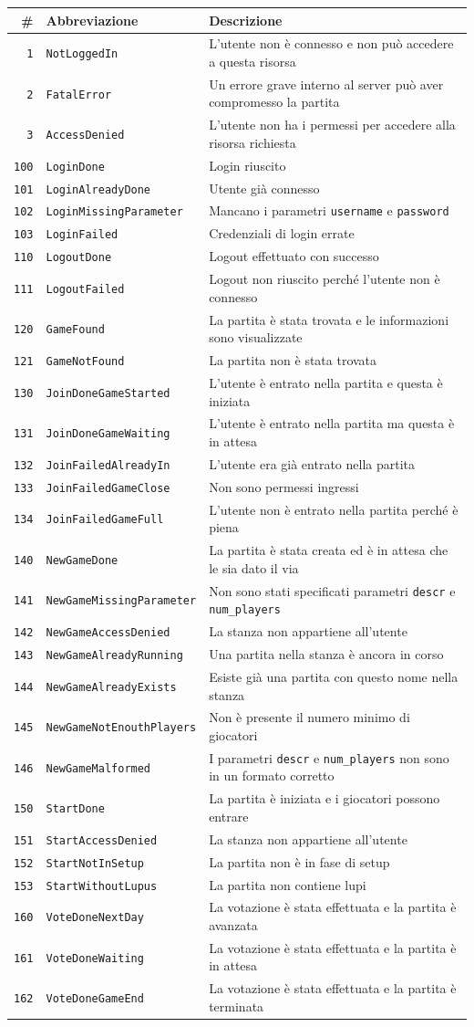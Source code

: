 \documentclass[10pt,a4paper]{article}
\newcommand{\apicode}[3]{
\texttt{#1} & \texttt{#2} & #3 \\
}
\begin{document}
\resizebox{\textwidth}{!} {
\begin{tabular}{|rl|l|}
\hline
\textbf{\#} & \textbf{Abbreviazione} & \textbf{Descrizione} \\
\hline
\apicode{1}{NotLoggedIn}{L'utente non è connesso e non può accedere a questa risorsa}
\apicode{2}{FatalError}{Un errore grave interno al server può aver compromesso la partita}
\apicode{3}{AccessDenied}{L'utente non ha i permessi per accedere alla risorsa richiesta}
\hline
\apicode{100}{LoginDone}{Login riuscito}
\apicode{101}{LoginAlreadyDone}{Utente già connesso}
\apicode{102}{LoginMissingParameter}{Mancano i parametri \texttt{username} e \texttt{password}}
\apicode{103}{LoginFailed}{Credenziali di login errate}
\hline
\apicode{110}{LogoutDone}{Logout effettuato con successo}
\apicode{111}{LogoutFailed}{Logout non riuscito perché l'utente non è connesso}
\hline
\apicode{120}{GameFound}{La partita è stata trovata e le informazioni sono visualizzate}
\apicode{121}{GameNotFound}{La partita non è stata trovata}
\hline
\apicode{130}{JoinDoneGameStarted}{L'utente è entrato nella partita e questa è iniziata}
\apicode{131}{JoinDoneGameWaiting}{L'utente è entrato nella partita ma questa è in attesa}
\apicode{132}{JoinFailedAlreadyIn}{L'utente era già entrato nella partita}
\apicode{133}{JoinFailedGameClose}{Non sono permessi ingressi}
\apicode{134}{JoinFailedGameFull}{L'utente non è entrato nella partita perché è piena}
\hline
\apicode{140}{NewGameDone}{La partita è stata creata ed è in attesa che le sia dato il via}
\apicode{141}{NewGameMissingParameter}{Non sono stati specificati parametri \texttt{descr} e \texttt{num\_players}}
\apicode{142}{NewGameAccessDenied}{La stanza non appartiene all'utente}
\apicode{143}{NewGameAlreadyRunning}{Una partita nella stanza è ancora in corso}
\apicode{144}{NewGameAlreadyExists}{Esiste già una partita con questo nome nella stanza}
\apicode{145}{NewGameNotEnouthPlayers}{Non è presente il numero minimo di giocatori}
\apicode{146}{NewGameMalformed}{I parametri \texttt{descr} e \texttt{num\_players} non sono in un formato corretto}
\hline
\apicode{150}{StartDone}{La partita è iniziata e i giocatori possono entrare}
\apicode{151}{StartAccessDenied}{La stanza non appartiene all'utente}
\apicode{152}{StartNotInSetup}{La partita non è in fase di setup}
\apicode{153}{StartWithoutLupus}{La partita non contiene lupi}
\hline
\apicode{160}{VoteDoneNextDay}{La votazione è stata effettuata e la partita è avanzata}
\apicode{161}{VoteDoneWaiting}{La votazione è stata effettuata e la partita è in attesa}
\apicode{162}{VoteDoneGameEnd}{La votazione è stata effettuata e la partita è terminata}

\end{tabular}}
\end{document}
